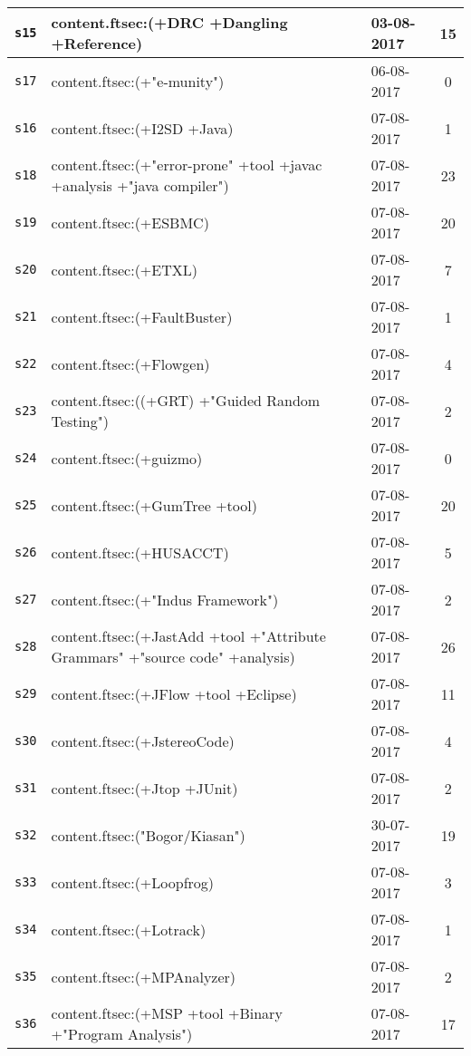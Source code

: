 \begin{longtable}{| l | p{13cm} | l | c |}
\texttt{s15} & content.ftsec:(+DRC +Dangling +Reference) & 03-08-2017 & 15 \\
    \hline
\texttt{s17} & content.ftsec:(+"e-munity") & 06-08-2017 & 0 \\
    \hline
\texttt{s16} & content.ftsec:(+I2SD +Java) & 07-08-2017 & 1 \\
    \hline
\texttt{s18} & content.ftsec:(+"error-prone" +tool +javac +analysis +"java compiler") & 07-08-2017 & 23 \\
    \hline
\texttt{s19} & content.ftsec:(+ESBMC) & 07-08-2017 & 20 \\
    \hline
\texttt{s20} & content.ftsec:(+ETXL) & 07-08-2017 & 7 \\
    \hline
\texttt{s21} & content.ftsec:(+FaultBuster) & 07-08-2017 & 1 \\
    \hline
\texttt{s22} & content.ftsec:(+Flowgen) & 07-08-2017 & 4 \\
    \hline
\texttt{s23} & content.ftsec:((+GRT) +"Guided Random Testing") & 07-08-2017 & 2 \\
    \hline
\texttt{s24} & content.ftsec:(+guizmo) & 07-08-2017 & 0 \\
    \hline
\texttt{s25} & content.ftsec:(+GumTree +tool) & 07-08-2017 & 20 \\
    \hline
\texttt{s26} & content.ftsec:(+HUSACCT) & 07-08-2017 & 5 \\
    \hline
\texttt{s27} & content.ftsec:(+"Indus Framework") & 07-08-2017 & 2 \\
    \hline
\texttt{s28} & content.ftsec:(+JastAdd +tool +"Attribute Grammars" +"source code" +analysis) & 07-08-2017 & 26 \\
    \hline
\texttt{s29} & content.ftsec:(+JFlow +tool +Eclipse) & 07-08-2017 & 11 \\
    \hline
\texttt{s30} & content.ftsec:(+JstereoCode) & 07-08-2017 & 4 \\
    \hline
\texttt{s31} & content.ftsec:(+Jtop +JUnit) & 07-08-2017 & 2 \\
    \hline
\texttt{s32} & content.ftsec:("Bogor/Kiasan") & 30-07-2017 & 19 \\
    \hline
\texttt{s33} & content.ftsec:(+Loopfrog) & 07-08-2017 & 3 \\
    \hline
\texttt{s34} & content.ftsec:(+Lotrack) & 07-08-2017 & 1 \\
    \hline
\texttt{s35} & content.ftsec:(+MPAnalyzer) & 07-08-2017 & 2 \\
    \hline
\texttt{s36} & content.ftsec:(+MSP +tool +Binary +"Program Analysis") & 07-08-2017 & 17 \\

\end{longtable}
